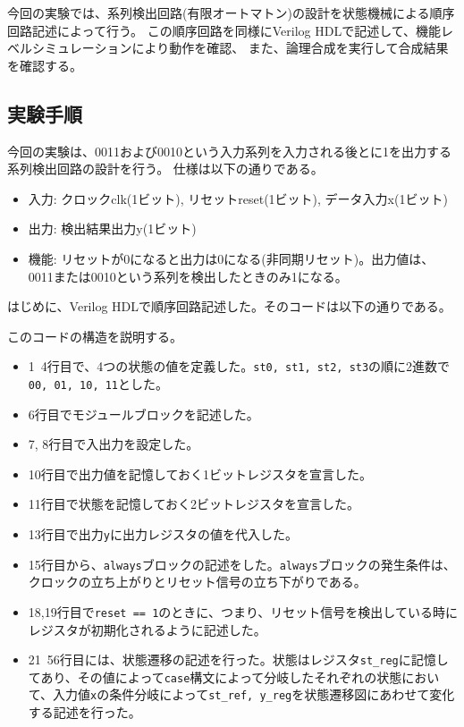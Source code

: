 \documentclass[uplatex]{jsarticle}
\begin{document}
今回の実験では、系列検出回路(有限オートマトン)の設計を状態機械による順序回路記述によって行う。
この順序回路を同様にVerilog HDLで記述して、機能レベルシミュレーションにより動作を確認、
また、論理合成を実行して合成結果を確認する。

\subsection{実験手順}

今回の実験は、0011および0010という入力系列を入力される後とに1を出力する系列検出回路の設計を行う。
仕様は以下の通りである。

\begin{itemize}
  \item 入力: クロックclk(1ビット), リセットreset(1ビット), データ入力x(1ビット)
  \item 出力: 検出結果出力y(1ビット)
  \item 機能: リセットが0になると出力は0になる(非同期リセット)。出力値は、0011または0010という系列を検出したときのみ1になる。
\end{itemize}

はじめに、Verilog HDLで順序回路記述した。そのコードは以下の通りである。



このコードの構造を説明する。

\begin{itemize}
  \item 1~4行目で、4つの状態の値を定義した。{\tt st0, st1, st2, st3}の順に2進数で{\tt 00, 01, 10, 11}とした。
  \item 6行目でモジュールブロックを記述した。
  \item 7, 8行目で入出力を設定した。
  \item 10行目で出力値を記憶しておく1ビットレジスタを宣言した。
  \item 11行目で状態を記憶しておく2ビットレジスタを宣言した。
  \item 13行目で出力{\tt y}に出力レジスタの値を代入した。
  \item 15行目から、{\tt always}ブロックの記述をした。{\tt always}ブロックの発生条件は、クロックの立ち上がりとリセット信号の立ち下がりである。
  \item 18,19行目で{\tt reset == 1}のときに、つまり、リセット信号を検出している時にレジスタが初期化されるように記述した。
  \item 21~56行目には、状態遷移の記述を行った。状態はレジスタ{\tt st\_reg}に記憶してあり、その値によって{\tt case}構文によって分岐したそれぞれの状態において、入力値{\tt x}の条件分岐によって{\tt st\_ref, y\_reg}を状態遷移図にあわせて変化する記述を行った。
\end{itemize}
\end{document}

